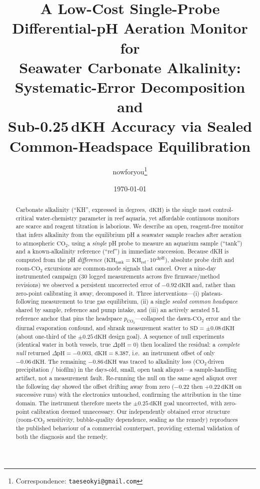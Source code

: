 \documentclass[11pt]{article}
\title{\bfseries A Low-Cost Single-Probe Differential-pH Aeration Monitor for\\
Seawater Carbonate Alkalinity: Systematic-Error Decomposition and\\
Sub-0.25\,dKH Accuracy via Sealed Common-Headspace Equilibration}
\author[1]{nowforyou\thanks{Correspondence: \texttt{taeseokyi@gmail.com}}}
\affil[1]{REEF FAMILY}
\date{\today}
\newcommand{\dpH}{\ensuremath{\Delta\mathrm{pH}}}
\newcommand{\dkh}{\ensuremath{\,\mathrm{dKH}}}
\newcommand{\co}{\ensuremath{\mathrm{CO_2}}}
\newcommand{\pco}{\ensuremath{p_{\mathrm{CO_2}}}}
\begin{document}
\maketitle

\begin{abstract}
\noindent
Carbonate alkalinity (``KH'', expressed in degrees, \dkh) is the single most
control-critical water-chemistry parameter in reef aquaria, yet affordable
continuous monitors are scarce and reagent titration is laborious. We describe
an open, reagent-free monitor that infers alkalinity from the equilibrium pH a
seawater sample reaches after aeration to atmospheric \co{}, using a
\emph{single} pH probe to measure an aquarium sample (``tank'') and a
known-alkalinity reference (``ref'') in immediate succession. Because dKH is
computed from the pH \emph{difference}
($\mathrm{KH_{tank}} = \mathrm{KH_{ref}}\cdot 10^{\dpH}$), absolute probe drift
and room-\co{} excursions are common-mode signals that cancel. Over a
nine-day instrumented campaign (30 logged measurements across five
firmware/method revisions) we observed a persistent uncorrected error of
$-0.92\dkh$ and, rather than zero-point calibrating it away, decomposed it.
Three interventions---(i) plateau-following measurement to true gas
equilibrium, (ii) a single \emph{sealed common headspace} shared by sample,
reference and pump intake, and (iii) an actively aerated 5\,L reference anchor
that pins the headspace \pco{}---collapsed the dawn-\co{} error and the
diurnal evaporation confound, and shrank measurement scatter to
$\mathrm{SD}=\pm0.08\dkh$ (about one-third of the $\pm0.25\dkh$ design goal). A
sequence of null experiments (identical water in both vessels, true
$\dpH=0$) then localized the residual: a \emph{complete null} returned
$\dpH=-0.003$, $\mathrm{dKH}=8.387$, i.e.\ an instrument offset of only
$-0.06\dkh$. The remaining $-0.86\dkh$ was traced to alkalinity loss
(\co{}\,driven  precipitation / biofilm) in the days-old, small,
open tank aliquot---a sample-handling artifact, not a measurement fault.
Re-running the null on the same aged aliquot over the following day showed the
offset drifting away from zero ($-0.22$ then $+0.22\dkh$ on successive runs) with
the electronics untouched, confirming the attribution in the time domain.
The instrument therefore meets the $\pm0.25\dkh$ goal uncorrected, with
zero-point calibration deemed unnecessary. Our independently obtained error
structure (room-\co{} sensitivity, bubble-quality dependence, sealing as the
remedy) reproduces the published behaviour of a commercial counterpart, providing
external validation of both the diagnosis and the remedy.
\end{abstract}
\end{document}
